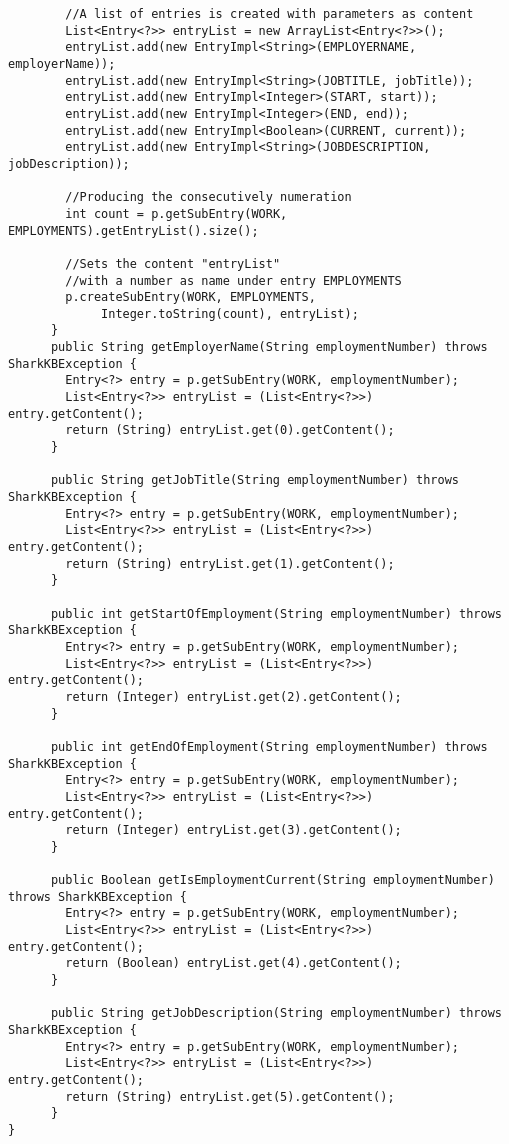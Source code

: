 \documentclass[12pt]{article}
\begin{document}
\begin{verbatim}
        //A list of entries is created with parameters as content
        List<Entry<?>> entryList = new ArrayList<Entry<?>>();
        entryList.add(new EntryImpl<String>(EMPLOYERNAME, employerName));
        entryList.add(new EntryImpl<String>(JOBTITLE, jobTitle));
        entryList.add(new EntryImpl<Integer>(START, start));
        entryList.add(new EntryImpl<Integer>(END, end));
        entryList.add(new EntryImpl<Boolean>(CURRENT, current));
        entryList.add(new EntryImpl<String>(JOBDESCRIPTION, jobDescription));

        //Producing the consecutively numeration 
        int count = p.getSubEntry(WORK, EMPLOYMENTS).getEntryList().size();

        //Sets the content "entryList"
        //with a number as name under entry EMPLOYMENTS 
        p.createSubEntry(WORK, EMPLOYMENTS,
             Integer.toString(count), entryList);
      }
      public String getEmployerName(String employmentNumber) throws SharkKBException {
        Entry<?> entry = p.getSubEntry(WORK, employmentNumber);
        List<Entry<?>> entryList = (List<Entry<?>>) entry.getContent();
        return (String) entryList.get(0).getContent();
      }

      public String getJobTitle(String employmentNumber) throws SharkKBException {
        Entry<?> entry = p.getSubEntry(WORK, employmentNumber);
        List<Entry<?>> entryList = (List<Entry<?>>) entry.getContent();
        return (String) entryList.get(1).getContent();
      }

      public int getStartOfEmployment(String employmentNumber) throws SharkKBException {
        Entry<?> entry = p.getSubEntry(WORK, employmentNumber);
        List<Entry<?>> entryList = (List<Entry<?>>) entry.getContent();
        return (Integer) entryList.get(2).getContent();
      }

      public int getEndOfEmployment(String employmentNumber) throws SharkKBException {
        Entry<?> entry = p.getSubEntry(WORK, employmentNumber);
        List<Entry<?>> entryList = (List<Entry<?>>) entry.getContent();
        return (Integer) entryList.get(3).getContent();
      }

      public Boolean getIsEmploymentCurrent(String employmentNumber) throws SharkKBException {
        Entry<?> entry = p.getSubEntry(WORK, employmentNumber);
        List<Entry<?>> entryList = (List<Entry<?>>) entry.getContent();
        return (Boolean) entryList.get(4).getContent();
      }

      public String getJobDescription(String employmentNumber) throws SharkKBException {
        Entry<?> entry = p.getSubEntry(WORK, employmentNumber);
        List<Entry<?>> entryList = (List<Entry<?>>) entry.getContent();
        return (String) entryList.get(5).getContent();
      }
}

\end{verbatim}
 
\end{document}
